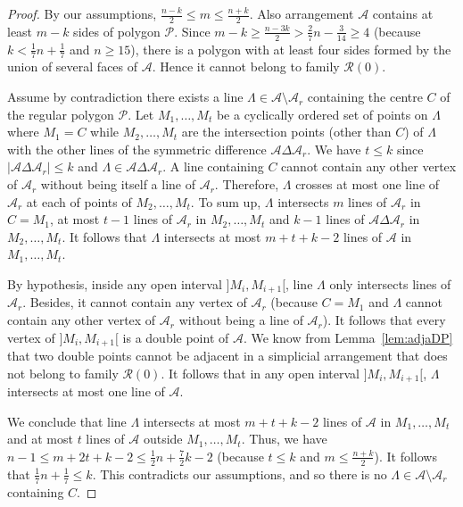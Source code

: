 \documentclass[a4paper,11pt,reqno]{amsart}
\theoremstyle{definition}
\theoremstyle{remark}
\theoremstyle{definition}
\theoremstyle{definition}
\theoremstyle{definition}
\numberwithin{equation}{section}
\begin{document}
\begin{proof}
By our assumptions, $\frac{n-k}{2} \leq m \leq \frac{n+k}{2}$. Also arrangement $\mathcal{A}$ contains at least $m-k$ sides of polygon $\mathcal{P}$. Since $m-k \geq \frac{n-3k}{2} > \frac{2}{7}n - \frac{3}{14} \geq 4$ (because $k < \frac{1}{7}n+\frac{1}{7}$ and $n \geq 15$), there is a polygon with at least four sides formed by the union of several faces of $\mathcal{A}$. Hence it cannot belong to family $\mathcal{R}(0)$.
\par
Assume by contradiction there exists a line $\Lambda \in \mathcal{A} \setminus \mathcal{A}_{r}$ containing the centre $C$ of the regular polygon $\mathcal{P}$. Let $M_{1},\dots,M_{t}$ be a cyclically ordered set of points on $\Lambda$ where $M_{1}=C$ while $M_{2},\dots,M_{t}$ are the intersection points (other than $C$) of $\Lambda$ with the other lines of the symmetric difference $\mathcal{A} \Delta \mathcal{A}_{r}$.  We have $t \leq k$ since $|\mathcal{A} \Delta \mathcal{A}_{r}| \leq k$ and $\Lambda \in \mathcal{A} \Delta \mathcal{A}_{r}$. A line containing $C$ cannot contain any other vertex of $\mathcal{A}_{r}$ without being itself a line of $\mathcal{A}_{r}$. Therefore, $\Lambda$ crosses at most one line of $\mathcal{A}_{r}$ at each of points of $M_{2},\dots,M_{t}$. To sum up, $\Lambda$ intersects $m$ lines of $\mathcal{A}_{r}$ in $C=M_{1}$, at most $t-1$ lines of $\mathcal{A}_{r}$ in $M_{2},\dots,M_{t}$ and $k-1$ lines of $\mathcal{A} \Delta \mathcal{A}_{r}$ in $M_{2},\dots,M_{t}$. It follows that $\Lambda$ intersects at most $m+t+k-2$ lines of $\mathcal{A}$ in $M_{1},\dots,M_{t}$. 
\par
By hypothesis, inside any open interval  $]M_{i},M_{i+1}[$, line $\Lambda$ only intersects lines of $\mathcal{A}_{r}$. Besides, it cannot contain any vertex of $\mathcal{A}_{r}$ (because $C=M_{1}$ and $\Lambda$ cannot contain any other vertex of $\mathcal{A}_{r}$ without being a line of $\mathcal{A}_{r}$). It follows that every vertex of $]M_{i},M_{i+1}[$ is a double point of $\mathcal{A}$. We know from Lemma~\ref{lem:adjaDP} that two double points cannot be adjacent in a simplicial arrangement that does not belong to family $\mathcal{R}(0)$. It follows that in any open interval $]M_{i},M_{i+1}[$, $\Lambda$ intersects at most one line of $\mathcal{A}$.
\par
We conclude that line $\Lambda$ intersects at most $m+t+k-2$ lines of $\mathcal{A}$ in $M_{1},\dots,M_{t}$ and at most $t$ lines of $\mathcal{A}$ outside $M_{1},\dots,M_{t}$. Thus, we have $n-1 \leq m+2t+k-2 \leq \frac{1}{2}n+\frac{7}{2}k-2$ (because $t \leq k$ and $m \leq \frac{n+k}{2}$). It follows that $\frac{1}{7}n + \frac{1}{7} \leq k$. This contradicts our assumptions, and so there is no $\Lambda \in \mathcal{A} \setminus \mathcal{A}_{r}$ containing $C$.
\end{proof}
\end{document}
